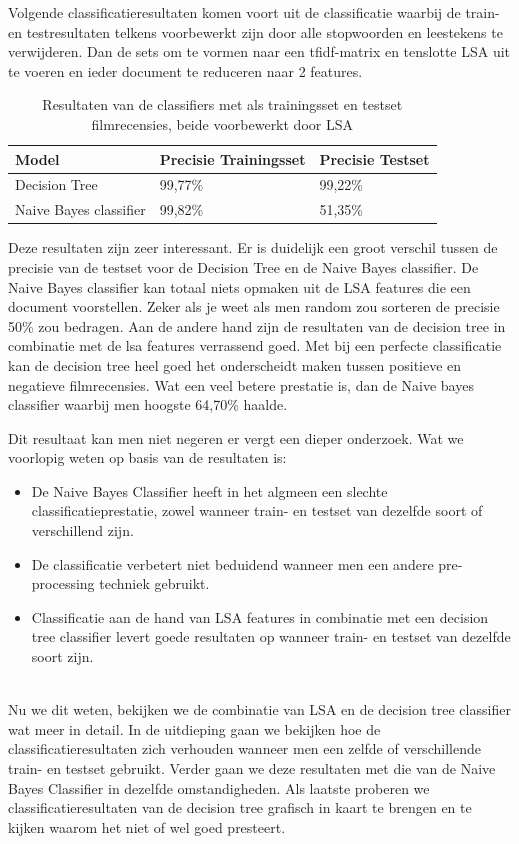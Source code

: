 Volgende classificatieresultaten komen voort uit de classificatie waarbij de train- en testresultaten telkens voorbewerkt zijn door alle stopwoorden en leestekens te verwijderen. Dan de sets om te vormen naar een tfidf-matrix en tenslotte LSA uit te voeren en ieder document te reduceren naar 2 features.
%
\begin{table}[h]
\centering
\begin{tabular}{|l|l|l|}
\hline
\textbf{Model}              &\textbf{Precisie Trainingsset}    &\textbf{Precisie Testset}    \\   \hline
Decision Tree               & 99,77\%                          & 99,22\%                     \\  \hline
Naive Bayes classifier      & 99,82\%                          & 51,35\%                     \\ \hline 
\end{tabular}
\caption{Resultaten van de classifiers met als trainingsset en testset filmrecensies, beide voorbewerkt door LSA }
\end{table}

Deze resultaten zijn zeer interessant. Er is duidelijk een groot verschil tussen de precisie van de testset voor de Decision Tree en de Naive Bayes classifier. De Naive Bayes classifier kan totaal niets opmaken uit de LSA features die een document voorstellen. Zeker als je weet als men random zou sorteren de precisie 50\%  zou bedragen. Aan de andere hand zijn de resultaten van de decision tree in combinatie met de  lsa features verrassend goed. Met bij een perfecte classificatie kan de decision tree heel goed het onderscheidt maken tussen positieve en negatieve filmrecensies. Wat een veel betere prestatie is, dan de Naive bayes classifier waarbij men hoogste 64,70\% haalde.

Dit resultaat kan men niet negeren er vergt een dieper onderzoek. Wat we  voorlopig weten op basis van de resultaten is:
%
\begin{itemize}
  \item De Naive Bayes Classifier heeft in het algmeen een slechte classificatieprestatie, zowel wanneer train- en testset van dezelfde soort of verschillend zijn.
  \item De classificatie verbetert niet beduidend wanneer men een andere pre-processing techniek gebruikt.
  \item Classificatie aan de hand van LSA features in combinatie met een decision tree classifier levert goede resultaten op wanneer train- en testset van dezelfde soort zijn.
\end{itemize}
\\
Nu we dit weten, bekijken we de combinatie van LSA en de decision tree classifier wat meer in detail. In de uitdieping gaan we bekijken hoe de classificatieresultaten zich verhouden wanneer men een zelfde of verschillende train- en testset gebruikt. Verder gaan we deze resultaten met die van de Naive Bayes Classifier in dezelfde omstandigheden. Als laatste proberen we classificatieresultaten van de decision tree grafisch in kaart te brengen en te kijken waarom het niet of wel goed presteert.   


